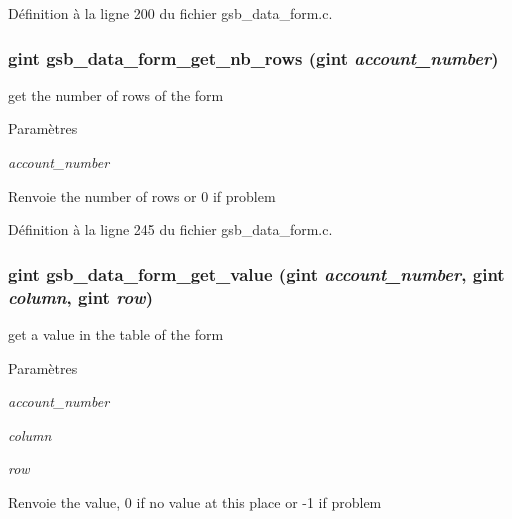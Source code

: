 Définition à la ligne 200 du fichier gsb\_\-data\_\-form.c.

\subsubsection[{gsb\_\-data\_\-form\_\-get\_\-nb\_\-rows}]{\setlength{\rightskip}{0pt plus 5cm}gint gsb\_\-data\_\-form\_\-get\_\-nb\_\-rows (gint {\em account\_\-number})}\label{gsb__data__form_8h_af5613a656e573f2e9a95d1c89c495c1c}
get the number of rows of the form


\begin{DoxyParams}{Paramètres}
\item[{\em account\_\-number}]\end{DoxyParams}
\begin{DoxyReturn}{Renvoie}
the number of rows or 0 if problem 
\end{DoxyReturn}


Définition à la ligne 245 du fichier gsb\_\-data\_\-form.c.

\subsubsection[{gsb\_\-data\_\-form\_\-get\_\-value}]{\setlength{\rightskip}{0pt plus 5cm}gint gsb\_\-data\_\-form\_\-get\_\-value (gint {\em account\_\-number}, \/  gint {\em column}, \/  gint {\em row})}\label{gsb__data__form_8h_a1f2dc075c964a00b50da003f969bb517}
get a value in the table of the form


\begin{DoxyParams}{Paramètres}
\item[{\em account\_\-number}]\item[{\em column}]\item[{\em row}]\end{DoxyParams}
\begin{DoxyReturn}{Renvoie}
the value, 0 if no value at this place or -\/1 if problem 
\end{DoxyReturn}


